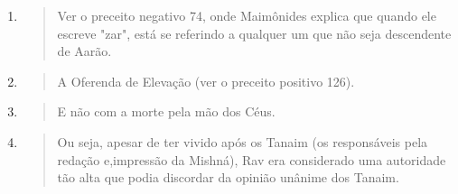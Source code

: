 \begin{enumerate}
\def\labelenumi{\arabic{enumi}.}
\setcounter{enumi}{294}
\item
  \begin{quote}
  Ver o preceito negativo 74, onde Maimônides explica que quando ele
  escreve "zar", está se referindo a qualquer um que não seja
  descendente de Aarão.
  \end{quote}
\item
  \begin{quote}
  A Oferenda de Elevação (ver o preceito positivo 126).
  \end{quote}
\item
  \begin{quote}
  E não com a morte pela mão dos Céus.
  \end{quote}
\item
  \begin{quote}
  Ou seja, apesar de ter vivido após os Tanaim (os responsáveis pela
  redação e,impressão da Mishná), Rav era considerado uma autoridade tão
  alta que podia discordar da opinião unânime dos Tanaim.
  \end{quote}
\end{enumerate}

